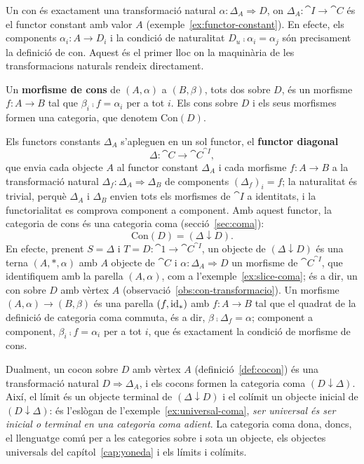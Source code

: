 \begin{observacio}\label{obs:con-transformacio}
Un con és exactament una transformació natural $\alpha\colon\Delta_A\Rightarrow D$, on $\Delta_A\colon\cat{I}\to\cat{C}$ és el functor constant amb valor $A$ (exemple~\ref{ex:functor-constant}). En efecte, els components $\alpha_i\colon A\to D_i$ i la condició de naturalitat $D_u\comp\alpha_i=\alpha_j$ són precisament la definició de con. Aquest és el primer lloc on la maquinària de les transformacions naturals rendeix directament.
\end{observacio}

\begin{definicio}
Un \textbf{morfisme de cons} de $(A,\alpha)$ a $(B,\beta)$, tots dos sobre $D$, és un morfisme $f\colon A\to B$ tal que $\beta_i\comp f=\alpha_i$ per a tot $i$. Els cons sobre $D$ i els seus morfismes formen una categoria, que denotem $\mathrm{Con}(D)$.
\end{definicio}

\begin{observacio}\label{obs:cons-coma}
Els functors constants $\Delta_A$ s'apleguen en un sol functor, el \textbf{functor diagonal}
\[
\Delta\colon\cat{C}\longrightarrow\cat{C}^{\cat{I}},
\]
que envia cada objecte $A$ al functor constant $\Delta_A$ i cada morfisme $f\colon A\to B$ a la transformació natural $\Delta_f\colon\Delta_A\Rightarrow\Delta_B$ de components $(\Delta_f)_i=f$; la naturalitat és trivial, perquè $\Delta_A$ i $\Delta_B$ envien tots els morfismes de $\cat{I}$ a identitats, i la functorialitat es comprova component a component. Amb aquest functor, la categoria de cons és una categoria coma (secció~\ref{sec:coma}):
\[
\mathrm{Con}(D)=(\Delta\downarrow D).
\]
En efecte, prenent $S=\Delta$ i $T=D\colon\cat{1}\to\cat{C}^{\cat{I}}$, un objecte de $(\Delta\downarrow D)$ és una terna $(A,\ast,\alpha)$ amb $A$ objecte de $\cat{C}$ i $\alpha\colon\Delta_A\Rightarrow D$ un morfisme de $\cat{C}^{\cat{I}}$, que identifiquem amb la parella $(A,\alpha)$, com a l'exemple~\ref{ex:slice-coma}; és a dir, un con sobre $D$ amb vèrtex $A$ (observació~\ref{obs:con-transformacio}). Un morfisme $(A,\alpha)\to(B,\beta)$ és una parella $(f,\operatorname{id}_\ast)$ amb $f\colon A\to B$ tal que el quadrat de la definició de categoria coma commuta, és a dir, $\beta\comp\Delta_f=\alpha$; component a component, $\beta_i\comp f=\alpha_i$ per a tot $i$, que és exactament la condició de morfisme de cons.

Dualment, un cocon sobre $D$ amb vèrtex $A$ (definició~\ref{def:cocon}) és una transformació natural $D\Rightarrow\Delta_A$, i els cocons formen la categoria coma $(D\downarrow\Delta)$. Així, el límit és un objecte terminal de $(\Delta\downarrow D)$ i el colímit un objecte inicial de $(D\downarrow\Delta)$: és l'eslògan de l'exemple~\ref{ex:universal-coma}, \emph{ser universal és ser inicial o terminal en una categoria coma adient}. La categoria coma dona, doncs, el llenguatge comú per a les categories sobre i sota un objecte, els objectes universals del capítol~\ref{cap:yoneda} i els límits i colímits.
\end{observacio}

